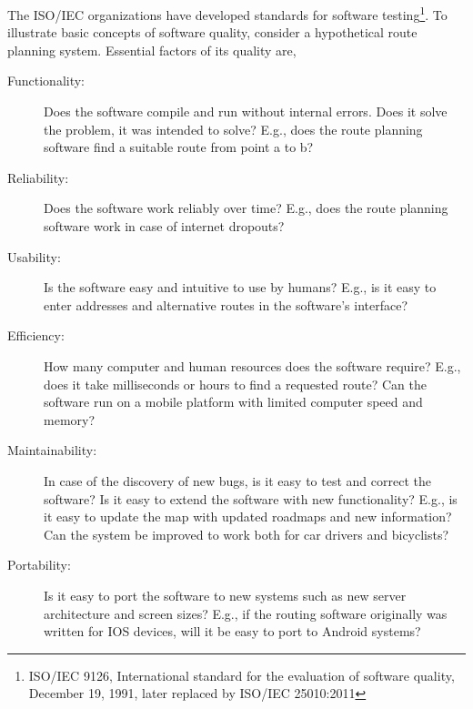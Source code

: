 The ISO/IEC organizations have developed standards for software testing\footnote{ISO/IEC 9126, International standard for the evaluation of software quality, December 19, 1991, later replaced by ISO/IEC 25010:2011}.  To illustrate basic concepts of software quality, consider a hypothetical route planning system. Essential factors of its quality are,
\begin{description}
\item[Functionality:] Does the software compile and run without internal errors. Does it solve the problem, it was intended to solve? E.g., does the route planning software find a suitable route from point a to b?
\item[Reliability:] Does the software work reliably over time? E.g., does the route planning software work in case of internet dropouts?
\item[Usability:] Is the software easy and intuitive to use by humans? E.g., is it easy to enter addresses and alternative routes in the software's interface?
\item[Efficiency:] How many computer and human resources does the software require? E.g., does it take milliseconds or hours to find a requested route? Can the software run on a mobile platform with limited computer speed and memory?
\item[Maintainability:] In case of the discovery of new bugs, is it easy to test and correct the software? Is it easy to extend the software with new functionality? E.g., is it easy to update the map with updated roadmaps and new information? Can the system be improved to work both for car drivers and bicyclists? 
\item[Portability:] Is it easy to port the software to new systems such as new server architecture and screen sizes? E.g., if the routing software originally was written for IOS devices, will it be easy to port to Android systems?
\end{description}
